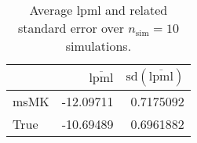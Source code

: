 \begin{table}[H]

\caption{Average lpml and related standard error over $n_{\text{sim}} = 10$ simulations.}
\centering
\begin{tabular}[t]{lrr}
\toprule
  & $\overbar{\text{lpml}}$ & $\text{sd}(\overbar{\text{lpml}})$\\
\midrule
msMK & -12.09711 & 0.7175092\\
True & -10.69489 & 0.6961882\\
\bottomrule
\end{tabular}
\end{table}